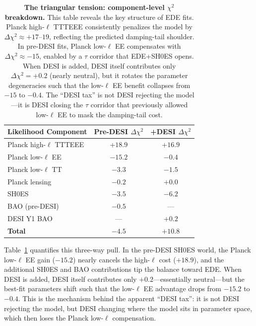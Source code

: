 \documentclass[a4paper,11pt]{article}
\begin{document}
\begin{table}[ht]
\centering
\caption{\textbf{The triangular tension: component-level $\chi^2$ breakdown.} This table reveals the key structure of EDE fits. Planck high-$\ell$ TTTEEE consistently penalizes the model by $\Delta\chi^2 \approx +17$--$19$, reflecting the predicted damping-tail shoulder. In pre-DESI fits, Planck low-$\ell$ EE compensates with $\Delta\chi^2 \approx -15$, enabled by a $\tau$ corridor that EDE+SH0ES opens. When DESI is added, DESI itself contributes only $\Delta\chi^2 = +0.2$ (nearly neutral), but it rotates the parameter degeneracies such that the low-$\ell$ EE benefit collapses from $-15$ to $-0.4$. The ``DESI tax'' is not DESI rejecting the model---it is DESI closing the $\tau$ corridor that previously allowed low-$\ell$ EE to mask the damping-tail cost.}
\label{tab:chi2_breakdown}
\begin{tabular}{lcc}
\toprule
\textbf{Likelihood Component} & \textbf{Pre-DESI $\Delta\chi^2$} & \textbf{+DESI $\Delta\chi^2$} \\
\midrule
Planck high-$\ell$ TTTEEE & $+18.9$ & $+16.9$ \\
Planck low-$\ell$ EE & $\mathbf{-15.2}$ & $-0.4$ \\
Planck low-$\ell$ TT & $-3.3$ & $-1.5$ \\
Planck lensing & $-0.2$ & $+0.0$ \\
SH0ES & $-3.5$ & $-6.2$ \\
BAO (pre-DESI) & $-0.5$ & --- \\
DESI Y1 BAO & --- & $+0.2$ \\
\midrule
\textbf{Total} & $\mathbf{-4.5}$ & $\mathbf{+10.8}$ \\
\bottomrule
\end{tabular}
\end{table}

Table~\ref{tab:chi2_breakdown} quantifies this three-way pull. In the pre-DESI SH0ES world, the Planck low-$\ell$ EE gain ($-15.2$) nearly cancels the high-$\ell$ cost ($+18.9$), and the additional SH0ES and BAO contributions tip the balance toward EDE. When DESI is added, DESI itself contributes only $+0.2$---essentially neutral---but the best-fit parameters shift such that the low-$\ell$ EE advantage drops from $-15.2$ to $-0.4$. This is the mechanism behind the apparent ``DESI tax'': it is not DESI rejecting the model, but DESI changing where the model sits in parameter space, which then loses the Planck low-$\ell$ compensation.
\end{document}

